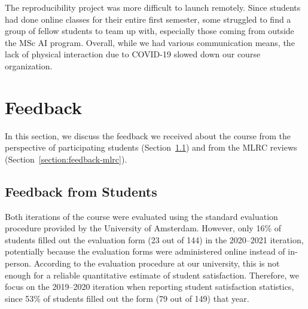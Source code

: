 \documentclass[letterpaper]{article}
\newcommand{\OurUniversity}{the University of Amsterdam}
\begin{document}
The reproducibility project was more difficult to launch remotely. 
Since students had done online classes for their entire first semester, some struggled to find a group of fellow students to team up with, especially those coming from outside the MSc AI program. 
Overall, while we had various communication means, the lack of physical interaction due to COVID-19 slowed down our course organization. 




\section{Feedback}
\label{section:feedback}

In this section, we discuss the feedback we received about the course from the perspective of participating students (Section~\ref{section:feedback-students}) and from the MLRC reviews (Section~\ref{section:feedback-mlrc}). 
 
\subsection{Feedback from Students}
\label{section:feedback-students}
Both iterations of the course were evaluated using the standard evaluation procedure provided by \OurUniversity. 
However, only 16\% of students filled out the evaluation form (23 out of 144) in the 2020--2021 iteration, potentially because the evaluation forms were administered online instead of in-person. 
According to the evaluation procedure at our university, this is not enough for a reliable quantitative estimate of student satisfaction.
Therefore, we focus on the 2019--2020 iteration when reporting student satisfaction statistics, since 53\% of students filled out the form (79 out of 149) that year. 
\end{document}
